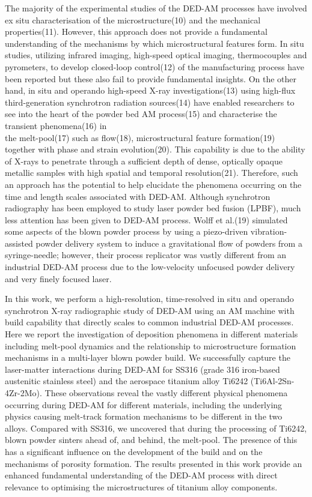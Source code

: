\documentclass[10pt]{article}
\begin{document}
The majority of the experimental studies of the DED-AM processes have involved ex situ characterisation of the microstructure(10) and the mechanical properties(11). However, this approach does not provide a fundamental understanding of the mechanisms by which microstructural features form. In situ studies, utilizing infrared imaging, high-speed optical imaging, thermocouples and pyrometers, to develop closed-loop control(12) of the manufacturing process have been reported but these also fail to provide fundamental insights. On the other hand, in situ and operando high-speed X-ray investigations(13) using high-flux third-generation synchrotron radiation sources(14) have enabled researchers to see into the heart of the powder bed AM process(15) and characterise the transient phenomena(16) in\\
the melt-pool(17) such as flow(18), microstructural feature formation(19) together with phase and strain evolution(20). This capability is due to the ability of X-rays to penetrate through a sufficient depth of dense, optically opaque metallic samples with high spatial and temporal resolution(21). Therefore, such an approach has the potential to help elucidate the phenomena occurring on the time and length scales associated with DED-AM. Although synchrotron radiography has been employed to study laser powder bed fusion (LPBF), much less attention has been given to DED-AM process. Wolff et al.(19) simulated some aspects of the blown powder process by using a piezo-driven vibration-assisted powder delivery system to induce a gravitational flow of powders from a syringe-needle; however, their process replicator was vastly different from an industrial DED-AM process due to the low-velocity unfocused powder delivery and very finely focused laser.

In this work, we perform a high-resolution, time-resolved in situ and operando synchrotron X-ray radiographic study of DED-AM using an AM machine with build capability that directly scales to common industrial DED-AM processes. Here we report the investigation of deposition phenomena in different materials including melt-pool dynamics and the relationship to microstructure formation mechanisms in a multi-layer blown powder build. We successfully capture the laser-matter interactions during DED-AM for SS316 (grade 316 iron-based austenitic stainless steel) and the aerospace titanium alloy Ti6242 (Ti6Al-2Sn-4Zr-2Mo). These observations reveal the vastly different physical phenomena occurring during DED-AM for different materials, including the underlying physics causing melt-track formation mechanisms to be different in the two alloys. Compared with SS316, we uncovered that during the processing of Ti6242, blown powder sinters ahead of, and behind, the melt-pool. The presence of this has a significant influence on the development of the build and on the mechanisms of porosity formation. The results presented in this work provide an enhanced fundamental understanding of the DED-AM process with direct relevance to optimising the microstructures of titanium alloy components.
\end{document}
